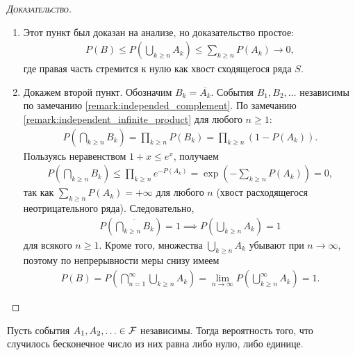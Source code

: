 \documentclass[../main.tex]{subfiles}
\begin{document}
\begin{proof}[\normalfont\textsc{Доказательство}]\
 \begin{enumerate}
  \item Этот пункт был доказан на анализе, но доказательство простое:
   \begin{align*}
    P(B) \leqslant P \left( \bigcup_{k \geqslant n} A_k \right) \leqslant \sum_{k \geqslant n} P(A_k) \to 0,
   \end{align*} где правая часть стремится к нулю как хвост сходящегося ряда $ S $.

  \item Докажем второй пункт. Обозначим $B_k = \overline {A_k}$. События $B_1, B_2, \ldots$ независимы по замечанию \ref{remark:independed_complement}. По замечанию \ref{remark:independent_infinite_product} для любого $ n \geqslant 1$:
   \begin{align*}
    P \left( \bigcap_{k \geqslant n} B_k \right) = \prod_{k \geqslant n} P(B_k) = \prod_{k \geqslant n} (1 - P(A_k)).
   \end{align*} Пользуясь неравенством $ 1 + x \leqslant e^{x} $, получаем 
   \begin{align*}
    P \left( \bigcap_{k \geqslant n} B_k \right) \leqslant \prod_{k \geqslant n} e^{-P(A_k)} = \exp \left(-\sum_{k \geqslant n} P(A_k)\right) = 0,
   \end{align*} так как $ \sum_{k \geqslant n} P(A_k) = +\infty $ для любого $ n $ (хвост расходящегося неотрицательного ряда). Следовательно,
   \begin{align*}
    P \left( \overline { \bigcap_{k \geqslant n} B_k } \right) = 1 \implies P \left( \bigcup_{k \geqslant n} A_k \right) = 1
   \end{align*} для всякого $ n \geqslant 1 $. Кроме того, множества $\bigcup_{k \geqslant n} A_k$ убывают при $ n \to \infty $, поэтому по непрерывности меры снизу имеем
   \begin{align*}
    P(B) = P \left( \bigcap_{n=1}^{\infty} \bigcup_{k \geqslant n} A_k \right) = \lim_{n \to \infty} P \left( \bigcup_{k \geqslant n}^{\infty} A_k \right) = 1.
   \end{align*}
 \end{enumerate}
\end{proof}
\begin{crly*}
 Пусть события $A_1, A_2, \ldots \in \mathcal F$ независимы. Тогда вероятность того, что случилось бесконечное число из них равна либо нулю, либо единице. 
\end{crly*}
\end{document}

